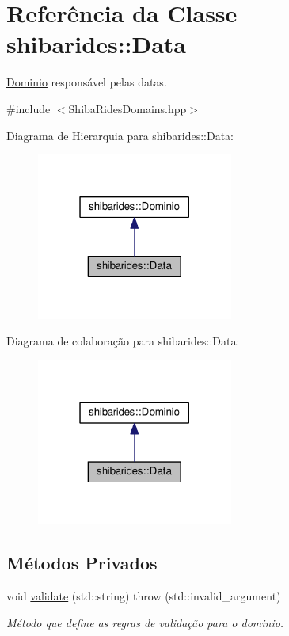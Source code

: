 \hypertarget{classshibarides_1_1Data}{}\section{Referência da Classe shibarides\+:\+:Data}
\label{classshibarides_1_1Data}


\hyperlink{classshibarides_1_1Dominio}{Dominio} responsável pelas datas.  




{\ttfamily \#include $<$Shiba\+Rides\+Domains.\+hpp$>$}



Diagrama de Hierarquia para shibarides\+:\+:Data\+:\nopagebreak
\begin{figure}[H]
\begin{center}
\leavevmode
\includegraphics[width=183pt]{classshibarides_1_1Data__inherit__graph}
\end{center}
\end{figure}


Diagrama de colaboração para shibarides\+:\+:Data\+:\nopagebreak
\begin{figure}[H]
\begin{center}
\leavevmode
\includegraphics[width=183pt]{classshibarides_1_1Data__coll__graph}
\end{center}
\end{figure}
\subsection*{Métodos Privados}
\begin{DoxyCompactItemize}
\item 
void \hyperlink{classshibarides_1_1Data_a6240717eb60d01a7ab0c12336685c862}{validate} (std\+::string)  throw (std\+::invalid\+\_\+argument)
\begin{DoxyCompactList}\small\item\em Método que define as regras de validação para o dominio. \end{DoxyCompactList}\end{DoxyCompactItemize}
